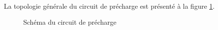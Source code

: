 		\paragraph*{}			
		La topologie générale du circuit de précharge est présenté à la figure \ref{fig:circuitprecharge}.
				
		\begin{figure}[H]
			\centering
			\caption[]{Schéma du circuit de précharge}
			\label{fig:circuitprecharge}
		\end{figure}
			
	\newpage	